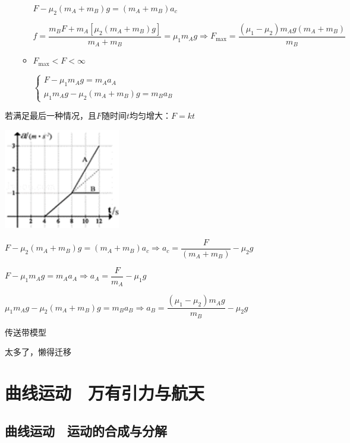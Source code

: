 \documentclass[cn,10.5pt,chinese,mac,chinesefont=founder]{elegantbook}
\begin{document}
\begin{problemset}
\begin{itemize}
\begin{itemize}
				$F-\mu_{2}\left(m_{A}+m_{B}\right) g=\left(m_{A}+m_{B}\right) a_{c}$
				
				$f=\dfrac{m_{B} F+m_{A}\left[\mu_{2}\left(m_{A}+m_{B}\right) g\right]}{m_{A}+m_{B}}=\mu_{1} m_{A} g \Rightarrow F_{\max }=\dfrac{\left(\mu_{1}-\mu_{2}\right) m_{A} g\left(m_{A}+m_{B}\right)}{m_{B}}$
			\item $F_{\max }<F<\infty$
				
				$\left\{\begin{array}{c}F-\mu_{1} m_{A} g=m_{A} a_{A} \\ \mu_{1} m_{A} g-\mu_{2}\left(m_{A}+m_{B}\right) g=m_{B} a_{B}\end{array}\right.$
		\end{itemize} 
			
	\end{itemize}
	\begin{example}
		若满足最后一种情况，且$F$随时间$t$均匀增大：$F=kt$
\begin{center}
	\includegraphics[width=2in]{media/34.png}
\end{center}
	$F-\mu_{2}\left(m_{A}+m_{B}\right) g=\left(m_{A}+m_{B}\right) a_{c} \Rightarrow a_{c}=\dfrac{F}{\left(m_{A}+m_{B}\right)}-\mu_{2} g$
	
	$F-\mu_{1} m_{A} g=m_{A} a_{A} \Rightarrow a_{A}=\dfrac{F}{m_{A}}-\mu_{1} g$
	
	$\mu_{1} m_{A} g-\mu_{2}\left(m_{A}+m_{B}\right) g=m_{B} a_{B} \Rightarrow a_{B}=\dfrac{\left(\mu_{1}-\mu_{2}\right) m_{A} g}{m_{B}}-\mu_{2} g$
	\end{example}
	\newpage
	\item 传送带模型
	
	太多了，懒得迁移
\end{problemset}

\chapter{曲线运动　万有引力与航天}
\section{曲线运动　运动的合成与分解}
\end{document}

